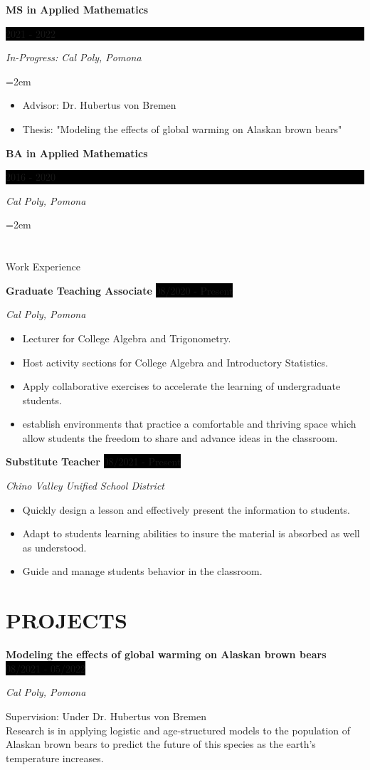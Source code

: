 \documentclass[paper=a4,fontsize=10pt]{scrartcl} %
\newcommand{\sepspace}{\vspace*{1em}}		%
\newcommand{\NewPart}[1]{\section*{\uppercase{#1}}}
\newcommand{\EducationEntry}[4]{
		\noindent \textbf{#1} \hfill      %
		\colorbox{Black}{%
			\parbox{5em}{%
			\hfill\color{White}#2}} \par  %
		\noindent \textit{#3} \par        %
		\noindent\hangindent=2em\hangafter=0 \small #4 %
		\normalsize \par}
\newcommand{\WorkEntry}[4]{				  %
		\noindent \textbf{#1} \hfill      %
		\colorbox{Black}{\color{White}#2} \par  %
		\noindent \textit{#3} \par              %
		\noindent \small #4 %
		\normalsize}
\begin{document}
\EducationEntry{MS in Applied Mathematics}{2021 - 2022}{In-Progress: Cal Poly, Pomona}
{
\begin{itemize}
    \item Advisor: Dr. Hubertus von Bremen
    \item Thesis: "Modeling the effects of global warming on Alaskan brown bears"
\end{itemize}
}
\sepspace

\EducationEntry{BA in Applied Mathematics}{2016 - 2020}{Cal Poly, Pomona}



\NewPart{Work Experience}{}

\WorkEntry{Graduate Teaching Associate}
{08/2020 - Present}
{Cal Poly, Pomona}
{\begin{itemize}[leftmargin=*]
    \item Lecturer for College Algebra and Trigonometry.
    \item Host activity sections for College Algebra and Introductory Statistics.
    \item Apply collaborative exercises to accelerate the learning of undergraduate students.
    \item establish environments that practice a comfortable and thriving space which allow students the freedom to share and advance ideas in the classroom.
\end{itemize}}

\sepspace

\WorkEntry{Substitute Teacher}
{08/2021 - Present}
{Chino Valley Unified School District}
{\begin{itemize}[leftmargin=*]
    \item Quickly design a lesson and effectively present the information to students.
    \item Adapt to students learning abilities to insure the material is absorbed as well as understood.
    \item Guide and manage students behavior in the classroom.
\end{itemize}}


\NewPart{Projects}{}

\WorkEntry{Modeling the effects of global warming on Alaskan brown bears}
{08/2021 - 05/2022}
{Cal Poly, Pomona}
{Supervision: Under Dr. Hubertus von Bremen\\
 Research is in applying logistic and age-structured models to the population of Alaskan brown bears to predict the future of this species as the earth's temperature increases.
}
\end{document}

